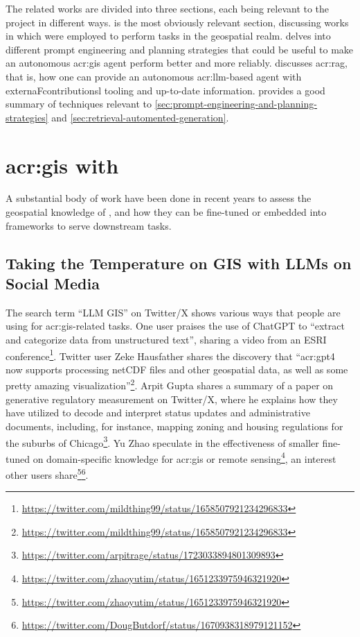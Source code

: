 The related works are divided into three sections, each being relevant to the project in different ways.  is the most obviously relevant section, discussing works in which  were employed to perform tasks in the geospatial realm.  delves into different prompt engineering and planning strategies that could be useful to make an autonomous \acrshort{acr:gis} agent perform better and more reliably.  discusses \gls{acr:rag}, that is, how one can provide an autonomous \acrshort{acr:llm}-based agent with externaFcontributionsl tooling and up-to-date information. \cite{wengLLMPoweredAutonomous2023} provides a good summary of techniques relevant to \autoref{sec:prompt-engineering-and-planning-strategies} and \autoref{sec:retrieval-automented-generation}.



\section[GIS with LLMs]{\acrshort{acr:gis} with }\label{sec:gis-with-llms}

A substantial body of work have been done in recent years to assess the geospatial knowledge of , and how they can be fine-tuned or embedded into frameworks to serve downstream tasks.

\subsection{Taking the Temperature on GIS with LLMs on Social Media}\label{subsec:social-media}

The search term \enquote{LLM GIS} on Twitter/X shows various ways that people are using  for \acrshort{acr:gis}-related tasks. One user praises the use of ChatGPT to \enquote{extract and categorize data from unstructured text}, sharing a video from an ESRI conference\footnote{\url{https://twitter.com/mildthing99/status/1658507921234296833}}. Twitter user Zeke Hausfather shares the discovery that \enquote{\acrshort{acr:gpt}4 now supports processing netCDF files and other geospatial data, as well as some pretty amazing visualization}\footnote{\url{https://twitter.com/mildthing99/status/1658507921234296833}}. Arpit Gupta shares a summary of a paper on generative regulatory measurement on Twitter/X, where he explains how they have utilized  to decode and interpret status updates and administrative documents, including, for instance, mapping zoning and housing regulations for the suburbs of Chicago\footnote{\url{https://twitter.com/arpitrage/status/1723033894801309893}}. Yu Zhao speculate in the effectiveness of smaller  fine-tuned on domain-specific knowledge for \acrshort{acr:gis} or remote sensing\footnote{\url{https://twitter.com/zhaoyutim/status/1651233975946321920}}, an interest other users share\footnote{\url{https://twitter.com/zhaoyutim/status/1651233975946321920}}\footnote{\url{https://twitter.com/DougButdorf/status/1670938318979121152}}.

